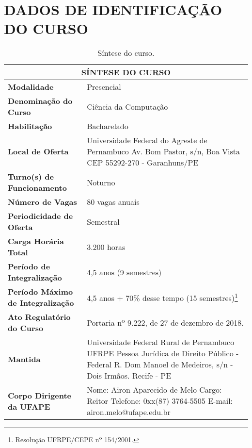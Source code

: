 \documentclass[
	12pt,				%
	openright,			%
  oneside,     %
	a4paper,			%
	english,			%
	french,				%
	spanish,			%
	brazil				%
	]{abntex2}
\begin{document}

\chapter*[Dados de Identificação do Curso]{DADOS DE IDENTIFICAÇÃO DO CURSO}


\begin{center}
\begin{footnotesize} 
\begin{longtable}{lp{9.4cm}}
  \caption{\label{quadro:sintese-do-curso}Síntese do curso.}\\
  \toprule
  \multicolumn{2}{c}{\bfseries SÍNTESE DO CURSO} \\
  \midrule
  \textbf{Modalidade} & Presencial \\ \midrule
  \textbf{Denominação do Curso}	& Ciência da Computação \\ \midrule
  \textbf{Habilitação}	& Bacharelado \\ \midrule
  \textbf{Local de Oferta}	& Universidade Federal do Agreste de Pernambuco \newline Av. Bom Pastor, s/n, Boa Vista \newline CEP 55292-270 - Garanhuns/PE \\ \midrule
  \textbf{Turno(s) de Funcionamento}	 & Noturno \\ \midrule
  \textbf{Número de Vagas}	& 80 vagas anuais \\ \midrule
  \textbf{Periodicidade de Oferta}	& Semestral \\ \midrule
  \textbf{Carga Horária Total} & 3.200 horas \\ \midrule
  \textbf{Período de Integralização}	& 4,5 anos (9 semestres) \\ \midrule
  \textbf{Período Máximo de Integralização} 	& 4,5 anos + 70\% desse tempo (15 semestres)\footnote{Resolução UFRPE/CEPE nº 154/2001.} \\ \midrule
  \textbf{Ato Regulatório do Curso} &	Portaria nº 9.222, de 27 de dezembro de 2018. \\ \midrule
  \textbf{Mantida}	& Universidade Federal Rural de Pernambuco UFRPE \newline Pessoa Jurídica de Direito Público - Federal \newline R. Dom Manoel de Medeiros, s/n - Dois Irmãos. Recife - PE \\ \midrule
  \textbf{Corpo Dirigente da UFAPE}	& Nome: Airon Aparecido de Melo \newline Cargo: Reitor \newline Telefone: 0xx(87) 3764-5505 \newline E-mail: airon.melo@ufape.edu.br \\
\bottomrule
\end{longtable}
\end{footnotesize}
\end{center}
\end{document}
